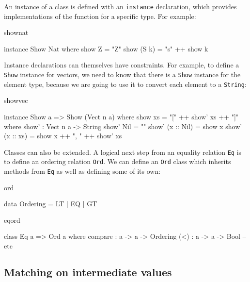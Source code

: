 \noindent
An instance of a class is defined with an \texttt{instance} declaration, which
provides implementations of the function for a specific type. For example:

\begin{SaveVerbatim}{shownat}

instance Show Nat where
    show Z = "Z"
    show (S k) = "s" ++ show k

\end{SaveVerbatim}

\noindent
Instance declarations can themselves have constraints. For example, to define a
\texttt{Show} instance for vectors, we need to know that there is a
\texttt{Show} instance for the element type, because we are going to use it to
convert each element to a \texttt{String}:

\begin{SaveVerbatim}{showvec}

instance Show a => Show (Vect n a) where
    show xs = "[" ++ show' xs ++ "]" where
        show' : Vect n a -> String
        show' Nil        = ""
        show' (x :: Nil) = show x
        show' (x :: xs)  = show x ++ ", " ++ show' xs

\end{SaveVerbatim}

\noindent
Classes can also be extended. A logical next step from an equality relation \texttt{Eq}
is to define an ordering relation \texttt{Ord}. We can define an \texttt{Ord} class
which inherits methods from \texttt{Eq} as well as defining some of its own:

\begin{SaveVerbatim}{ord}

data Ordering = LT | EQ | GT

\end{SaveVerbatim}

\begin{SaveVerbatim}{eqord}

class Eq a => Ord a where
    compare : a -> a -> Ordering
    (<) : a -> a -> Bool
    -- etc

\end{SaveVerbatim}

\subsection{Matching on intermediate values}

